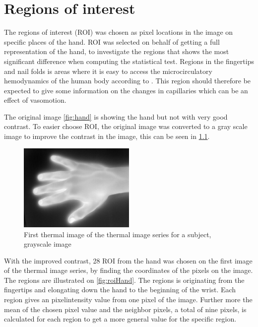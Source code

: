 \chapter{Regions of interest}

The regions of interest (ROI) was chosen as pixel locations in the image on specific places of the hand. ROI was selected on behalf of getting a full representation of the hand, to investigate the regions that shows the most significant difference when computing the statistical test. 
Regions in the fingertips and nail folds is areas where it is easy to access the microcirculatory hemodynamics of the human body according to \cite{Iabichella2006}. This region should therefore be expected to give some information on the changes in capillaries which can be an effect of vasomotion. 

The original image \ref{fig:hand} is showing the hand but not with very good contrast. To easier choose ROI, the original image was converted to a gray scale image to improve the contrast in the image, this can be seen in \ref{fig:mat2grayHand}. 

\begin{figure}[H]
	\includegraphics[width=0.5\textwidth]{figures/mat2grayHand}  %
	\caption{First thermal image of the thermal image series for a subject, grayscale image}
	\label{fig:mat2grayHand}  %
\end{figure}

With the improved contrast, 28 ROI from the hand was chosen on the first image of the thermal image series, by finding the coordinates of the pixels on the image. The regions are illustrated on \ref{fig:roiHand}. The regions is originating from the fingertips and elongating down the hand to the beginning of the wrist. Each region gives an pixelintensity value from one pixel of the image. Further more the mean of the chosen pixel value and the neighbor pixels, a total  of nine pixels, is calculated for each region to get a more general value for the specific region.

